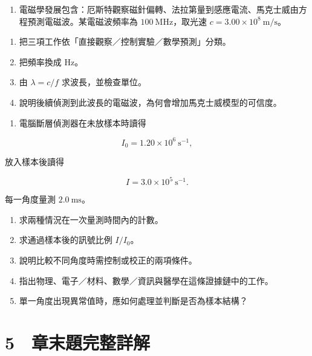 \documentclass[11pt,a4paper]{article}
\providecommand{\tightlist}{%
  \setlength{\itemsep}{0pt}\setlength{\parskip}{0pt}}
\begin{document}
\begin{enumerate}
\def\labelenumi{\arabic{enumi}.}
\setcounter{enumi}{14}
\tightlist
\item
  電磁學發展包含：厄斯特觀察磁針偏轉、法拉第量到感應電流、馬克士威由方程預測電磁波。某電磁波頻率為 \(100\ \mathrm{MHz}\)，取光速 \(c=3.00\times10^8\ \mathrm{m/s}\)。
\end{enumerate}

\begin{enumerate}
\def\labelenumi{(\arabic{enumi})}
\tightlist
\item
  把三項工作依「直接觀察／控制實驗／數學預測」分類。\\
\item
  把頻率換成 Hz。\\
\item
  由 \(\lambda=c/f\) 求波長，並檢查單位。\\
\item
  說明後續偵測到此波長的電磁波，為何會增加馬克士威模型的可信度。
\end{enumerate}

\begin{enumerate}
\def\labelenumi{\arabic{enumi}.}
\setcounter{enumi}{15}
\tightlist
\item
  電腦斷層偵測器在未放樣本時讀得
\end{enumerate}

\[
I_0=1.20\times10^6\ \mathrm{s^{-1}},
\]

放入樣本後讀得

\[
I=3.0\times10^5\ \mathrm{s^{-1}}.
\]

每一角度量測 \(2.0\ \mathrm{ms}\)。

\begin{enumerate}
\def\labelenumi{(\arabic{enumi})}
\tightlist
\item
  求兩種情況在一次量測時間內的計數。\\
\item
  求通過樣本後的訊號比例 \(I/I_0\)。\\
\item
  說明比較不同角度時需控制或校正的兩項條件。\\
\item
  指出物理、電子／材料、數學／資訊與醫學在這條證據鏈中的工作。\\
\item
  單一角度出現異常值時，應如何處理並判斷是否為樣本結構？
\end{enumerate}

\section{5　章末題完整詳解}\label{ux7ae0ux672bux984cux5b8cux6574ux8a73ux89e3}
\end{document}
